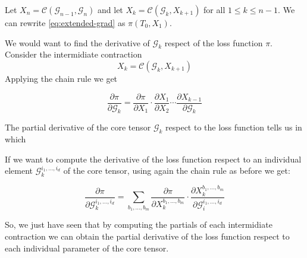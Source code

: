 \documentclass[11pt,a4paper,openright,oneside]{book}
\numberwithin{equation}{section}
\begin{document}
{Let $X_n = \mathcal{C}(\mathcal{G}_{n-1}, \mathcal{G}_n)$ and let $X_{k} = \mathcal{C}(\mathcal{G}_k, X_{k+1})$ for all $1 \leqslant k \leqslant n - 1$.
We can rewrite \ref{eq:extended-grad} as $\pi(T_0, X_1)$.

We would want to find the derivative of $\mathcal{G}_k$ respect of the loss function $\pi$. Consider the intermidiate
contraction $$X_k = \mathcal{C}(\mathcal{G}_k, X_{k+1})$$
Applying the chain rule we get

\begin{equation}
    \frac{\partial \pi}{\partial \mathcal{G}_k} = \frac{\partial \pi}{\partial X_1} \cdot \frac{\partial X_1}{\partial X_2} \cdots
    \frac{\partial X_{k-1}}{\partial \mathcal{G}_{k}}
\end{equation}

The partial derivative of the core tensor $\mathcal{G}_k$ respect to the loss function tells us in which 

If we want to compute the derivative of the loss function respect to an individual element $\mathcal{G}_k^{i_1, \dots, i_d}$
of the core tensor, using again the chain rule as before we get:

\begin{equation}
    \frac{\partial \pi}{\partial \mathcal{G}_k^{i_1, \dots, i_d}} = \sum_{b_1, \dots, b_m} \frac{\partial \pi}{\partial X_k^{b_1, \dots, b_m}} \cdot 
    \frac{\partial X_k^{b_1, \dots, b_m}}{\partial \mathcal{G}_i^{i_1, \dots, i_d}}
\end{equation}

So, we just have seen that by computing the partials of each intermidiate contraction we can obtain the partial derivative of the loss function
respect to each individual parameter of the core tensor.

}
\end{document}
